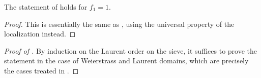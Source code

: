 \begin{lemma}\label{lem: key vdP Laurent}
    The statement of  holds for $f_{1}=1$. 
\end{lemma}
\begin{proof}
    This is essentially the same as , using the universal property of the localization  instead. 
\end{proof}
\begin{proof}[Proof of ]
    By induction on the Laurent order on the sieve, it suffices to prove the statement in the case of Weierstrass and Laurent domains, which are precisely the cases treated in . 
\end{proof}